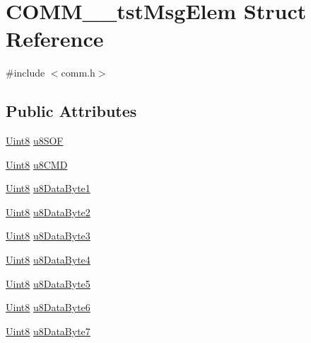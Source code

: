 \hypertarget{struct_c_o_m_m____tst_msg_elem}{}\section{C\+O\+M\+M\+\_\+\+\_\+tst\+Msg\+Elem Struct Reference}
\label{struct_c_o_m_m____tst_msg_elem}


{\ttfamily \#include $<$comm.\+h$>$}

\subsection*{Public Attributes}
\begin{DoxyCompactItemize}
\item 
\hyperlink{_d_s_p2833x___device_8h_af84840501dec18061d18a68c162a8fa2}{Uint8} \hyperlink{struct_c_o_m_m____tst_msg_elem_a65aaf238c2fe3f2c5d2dd46ad0efae4d}{u8\+S\+O\+F}
\item 
\hyperlink{_d_s_p2833x___device_8h_af84840501dec18061d18a68c162a8fa2}{Uint8} \hyperlink{struct_c_o_m_m____tst_msg_elem_a741aac1823e232f3e5c764eb2ecb87b9}{u8\+C\+M\+D}
\item 
\hyperlink{_d_s_p2833x___device_8h_af84840501dec18061d18a68c162a8fa2}{Uint8} \hyperlink{struct_c_o_m_m____tst_msg_elem_ae4263ed341e8244621fd9272d967cb9f}{u8\+Data\+Byte1}
\item 
\hyperlink{_d_s_p2833x___device_8h_af84840501dec18061d18a68c162a8fa2}{Uint8} \hyperlink{struct_c_o_m_m____tst_msg_elem_a028e937fe6f89513fce6bcd6871ed050}{u8\+Data\+Byte2}
\item 
\hyperlink{_d_s_p2833x___device_8h_af84840501dec18061d18a68c162a8fa2}{Uint8} \hyperlink{struct_c_o_m_m____tst_msg_elem_a5d1aae68ea2c123eb9f42fdd0f897eba}{u8\+Data\+Byte3}
\item 
\hyperlink{_d_s_p2833x___device_8h_af84840501dec18061d18a68c162a8fa2}{Uint8} \hyperlink{struct_c_o_m_m____tst_msg_elem_a7a0b5d84612c0b6de911935c5641b755}{u8\+Data\+Byte4}
\item 
\hyperlink{_d_s_p2833x___device_8h_af84840501dec18061d18a68c162a8fa2}{Uint8} \hyperlink{struct_c_o_m_m____tst_msg_elem_a896a7f3bae79c54091589f7c9f2937a1}{u8\+Data\+Byte5}
\item 
\hyperlink{_d_s_p2833x___device_8h_af84840501dec18061d18a68c162a8fa2}{Uint8} \hyperlink{struct_c_o_m_m____tst_msg_elem_aeff7c5d77bf82511baf4b70dc0202b9f}{u8\+Data\+Byte6}
\item 
\hyperlink{_d_s_p2833x___device_8h_af84840501dec18061d18a68c162a8fa2}{Uint8} \hyperlink{struct_c_o_m_m____tst_msg_elem_aa2e4a71781bfb80976c34ae1af91f16f}{u8\+Data\+Byte7}

\end{DoxyCompactItemize}
